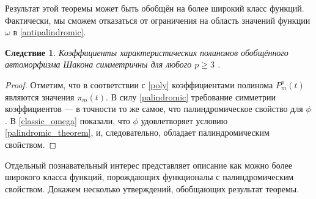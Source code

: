 \documentclass[14pt, a4paper, russian]{report}
\newtheorem{corollary}{\indent Следствие}
\begin{document}
Результат этой теоремы может быть обобщён на более широкий класс функций. Фактически, мы сможем отказаться от ограничения на область значений функции $\omega$ в \cref{antipalindromic}.

\begin{corollary}\label{chacon_symmetry}
Коэффициенты характеристических полиномов обобщённого автоморфизма Шакона симметричны для любого $p \ge 3$ .
\end{corollary}
\begin{proof}
Отметим, что в соответствии с \cref{poly} коэффициентами полинома $P_m^p(t)$ являются значения $\pi_m(t)$. В силу \cref{palindromic} требование симметрии коэффициентов --- в точности то же самое, что палиндромическое свойство для $\phi$. В \cref{classic_omega} показали, что $\phi$ удовлетворяет условию \cref{palindromic_theorem}, и, следовательно, обладает палиндромическим свойством.
\end{proof}

Отдельный познавательный интерес представляет описание как можно более широкого класса функций, порождающих функционалы с палиндромическим свойством. Докажем несколько утверждений, обобщающих результат теоремы.
\end{document}
